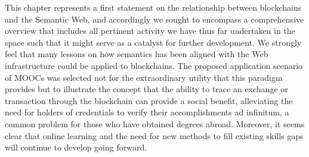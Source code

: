 This chapter represents a first statement on the relationship between blockchains and the Semantic Web, and accordingly we sought to encompass a comprehensive overview that includes all pertinent activity we have thus far undertaken in the space such that it might serve as a catalyst for further development.
We strongly feel that many lessons on how semantics has been aligned with the Web infrastructure could be applied to blockchains. 
The proposed application scenario of MOOCs was selected not for the extraordinary utility that this paradigm provides but to illustrate the concept that the ability to trace an exchange or transaction through the blockchain can provide a social benefit, alleviating the need for holders of credentials to verify their accomplishments ad infinitum, a common problem for those who have obtained degrees abroad.  
Moreover, it seems clear that online learning and the need for new methods to fill existing skills gaps will continue to develop going forward.




